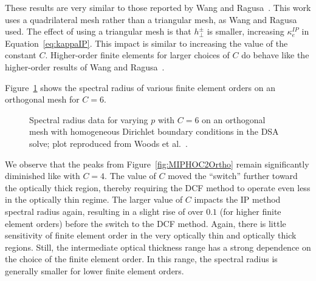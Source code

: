 \documentclass[12pt,letterpaper]{article}
\begin{document}
These results are very similar to those reported by Wang and Ragusa~\cite{WangRagusaDSA}. This work uses a quadrilateral mesh rather than a triangular mesh, as Wang and Ragusa~\cite{WangRagusaDSA} used. The effect of using a triangular mesh is that $h_\perp^\pm$ is smaller, increasing $\kappa_e^{IP}$ in Equation~\ref{eq:kappaIP}. This impact is similar to increasing the value of the constant $C$. Higher-order finite elements for larger choices of $C$ do behave like the higher-order results of Wang and Ragusa~\cite{WangRagusaDSA}.

\FloatBarrier

Figure~\ref{fig:MIPHOC6Ortho} shows the spectral radius of various finite element orders on an orthogonal mesh for $C=6$.
%
\begin{figure}[!hbt]
\centering
{}
\caption{Spectral radius data for varying $p$ with $C=6$ on an orthogonal mesh with homogeneous Dirichlet boundary conditions in the DSA solve; plot reproduced from Woods et al.~\cite{WoodsDSA}.}
\label{fig:MIPHOC6Ortho}
\end{figure}
%
We observe that the peaks from Figure~\ref{fig:MIPHOC2Ortho} remain significantly diminished like with $C=4$. The value of $C$ moved the ``switch'' further toward the optically thick region, thereby requiring the DCF method to operate even less in the optically thin regime. The larger value of $C$ impacts the IP method spectral radius again, resulting in a slight rise of over $0.1$ (for higher finite element orders) before the switch to the DCF method. Again, there is little sensitivity of finite element order in the very optically thin and optically thick regions. Still, the intermediate optical thickness range has a strong dependence on the choice of the finite element order. In this range, the spectral radius is generally smaller for lower finite element orders.
\end{document}
